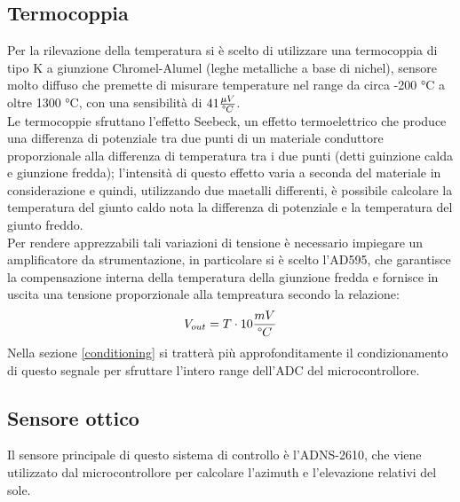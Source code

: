 \documentclass[12pt]{article}
\begin{document}
        \vspace{0.1cm}


    \subsection{Termocoppia}\label{thermocouple}
    Per la rilevazione della temperatura si è scelto di utilizzare una termocoppia di tipo K a giunzione Chromel-Alumel (leghe metalliche a base di nichel), sensore molto diffuso che premette di misurare temperature nel range da circa -200 °C a oltre 1300 °C, con una sensibilità di $41 \frac{\mu V}{\degree C}$.\\
    Le termocoppie sfruttano l'effetto Seebeck, un effetto termoelettrico che produce una differenza di potenziale tra due punti di un materiale conduttore proporzionale alla differenza di temperatura tra i due punti (detti guinzione calda e giunzione fredda); l'intensità di questo effetto varia a seconda del materiale in considerazione e quindi, utilizzando due maetalli differenti, è possibile calcolare la temperatura del giunto caldo nota la differenza di potenziale e la temperatura del giunto freddo.\\
    Per rendere apprezzabili tali variazioni di tensione è necessario impiegare un amplificatore da strumentazione, in particolare si è scelto l'AD595, che garantisce la compensazione interna della temperatura della giunzione fredda e fornisce in uscita una tensione proporzionale alla tempreatura secondo la relazione:
    \begin{equation}\label{thermocouple_relation_AD595}
        V_{out} = T \cdot 10 \frac{mV}{\degree C}
    \end{equation}
    Nella sezione \ref{conditioning} si tratterà più approfonditamente il condizionamento di questo segnale per sfruttare l'intero range dell'ADC del microcontrollore.
    
    
    \subsection{Sensore ottico}\label{optical_sensor}
    Il sensore principale di questo sistema di controllo è l'ADNS-2610, che viene utilizzato dal microcontrollore per calcolare l'azimuth e l'elevazione relativi del sole.\\
    
\end{document}
